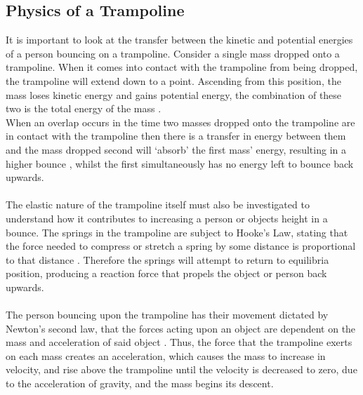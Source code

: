 \subsection{Physics of a Trampoline}


\noindent It is important to look at the transfer between the kinetic and potential energies of a person bouncing on a trampoline. Consider a single mass dropped onto a trampoline. When it comes into contact with the trampoline from being dropped, the trampoline will extend down to a point. Ascending from this position, the mass loses kinetic energy and gains potential energy, the combination of these two is the total energy of the mass \cite{physics}. \\

\noindent When an overlap occurs in the time two masses dropped onto the trampoline are in contact with the trampoline then there is a transfer in energy between them and the mass dropped second will `absorb' the first mass' energy, resulting in a higher bounce \cite{physics}, whilst the first simultaneously has no energy left to bounce back upwards.
\\
\\%
\noindent The elastic nature of the trampoline itself must also be investigated to understand how it contributes to increasing a person or objects height in a bounce. The springs in the trampoline are subject to Hooke's Law, stating that the force needed to compress or stretch a spring by some distance is proportional to that distance \cite{physics}. Therefore the springs will attempt to return to equilibria position, producing a reaction force that propels the object or person back upwards. 
\\
\\
The person bouncing upon the trampoline has their movement dictated by Newton's second law, that the forces acting upon an object are dependent on the mass and acceleration of said object \cite{nasa}. Thus, the force that the trampoline exerts on each mass creates an acceleration, which causes the mass to increase in velocity, and rise above the trampoline until the velocity is decreased to zero, due to the acceleration of gravity, and the mass begins its descent. %